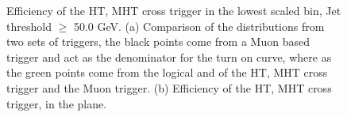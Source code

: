 \begin{figure}[h!]
    \centering
     \caption{Efficiency of the HT, MHT cross trigger in the lowest
       scaled bin, Jet \PT threshold $\geq $ 50.0 GeV.  (a) Comparison
       of the \alt distributions from two sets of triggers, the black
       points come from a Muon based trigger and act as the
       denominator for the turn on curve, where as the green points
       come from the logical and of the HT, MHT cross trigger and the
       Muon trigger. (b) Efficiency of the HT, MHT cross trigger, in
       the \alt plane.}
\end{figure}
